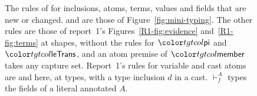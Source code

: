 \begin{figure}[t]
\color{black}
\caption{The rules of \treeK for inclusions, atoms, terms, values and fields that are new or changed.  and  are those of Figure~\ref{fig:mini-typing}. The other rules are those of report~1's Figures~\ref{R1-fig:evidence} and~\ref{R1-fig:terms} at shapes, without the rules for $\ev{pi}$ and $\ev{leTrans}$, and an atom premise of $\ev{member}$ takes any capture set. Report~1's rules for variable and cast atoms are  and  here, at types, with a type inclusion $d$ in a cast. $\vdash^{A}_{\!f}$ types the fields of a literal annotated $A$.}
\label{fig:target-rules}
\end{figure}

